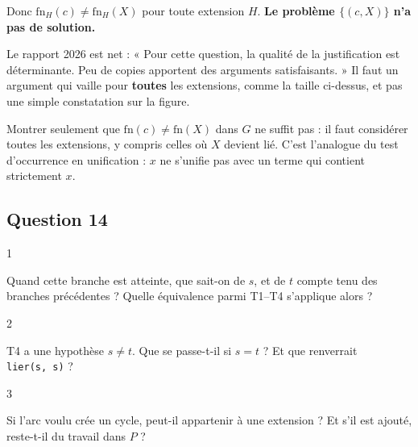 \documentclass[11pt,a4paper]{article}
\newcommand{\equationajustee}[1]{%
  \sbox{\boiteequation}{$\displaystyle #1$}%
  \ifdim\wd\boiteequation>\linewidth
    \[\resizebox{\linewidth}{!}{\usebox{\boiteequation}}\]%
  \else
    \[#1\]%
  \fi}
\begin{document}
\equationajustee{|{\mathrm{fn}}_H(c)|=1+|{\mathrm{fn}}_H(X)|+|{\mathrm{fn}}_H(Y)|>|{\mathrm{fn}}_H(X)|.}

Donc \({\mathrm{fn}}_H(c)\neq{\mathrm{fn}}_H(X)\) pour toute extension \(H\). \textbf{Le problème \(\{(c,X)\}\) n'a pas de solution.}

\begin{jury}

Le rapport 2026 est net : « Pour cette question, la qualité de la justification est déterminante. Peu de copies apportent des arguments satisfaisants. » Il faut un argument qui vaille pour \textbf{toutes} les extensions, comme la taille ci-dessus, et pas une simple constatation sur la figure.

\end{jury}

\begin{piege}

Montrer seulement que \(\mathrm{fn}(c)\neq\mathrm{fn}(X)\) dans \(G\) ne suffit pas : il faut considérer toutes les extensions, y compris celles où \(X\) devient lié. C'est l'analogue du test d'occurrence en unification : \(x\) ne s'unifie pas avec un terme qui contient strictement \(x\).

\end{piege}

\hypertarget{question-14}{%
\subsection{Question 14}\label{question-14}}

\begin{indication}{1}

Quand cette branche est atteinte, que sait-on de \(s\), et de \(t\) compte tenu des branches précédentes ? Quelle équivalence parmi T1--T4 s'applique alors ?

\end{indication}

\begin{indication}{2}

T4 a une hypothèse \(s\neq t\). Que se passe-t-il si \(s=t\) ? Et que renverrait \texttt{lier(s,\ s)} ?

\end{indication}

\begin{indication}{3}

Si l'arc voulu crée un cycle, peut-il appartenir à une extension ? Et s'il est ajouté, reste-t-il du travail dans \(P\) ?

\end{indication}
\end{document}
